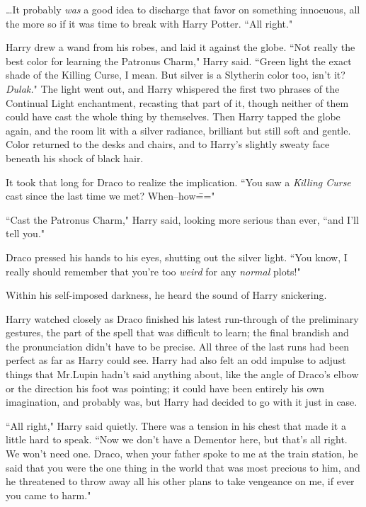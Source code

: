 {\ldots}It probably \emph{was} a good idea to discharge that favor on something innocuous, all the more so if it was time to break with Harry Potter. ``All right."

Harry drew a wand from his robes, and laid it against the globe. ``Not really the best color for learning the Patronus Charm," Harry said. ``Green light the exact shade of the Killing Curse, I mean. But silver is a Slytherin color too, isn't it? \emph{Dulak.}" The light went out, and Harry whispered the first two phrases of the Continual Light enchantment, recasting that part of it, though neither of them could have cast the whole thing by themselves. Then Harry tapped the globe again, and the room lit with a silver radiance, brilliant but still soft and gentle. Color returned to the desks and chairs, and to Harry's slightly sweaty face beneath his shock of black hair.

It took that long for Draco to realize the implication. ``You saw a \emph{Killing Curse} cast since the last time we met? When\---how\==="

``Cast the Patronus Charm," Harry said, looking more serious than ever, ``and I'll tell you."

Draco pressed his hands to his eyes, shutting out the silver light. ``You know, I really should remember that you're too \emph{weird} for any \emph{normal} plots!"

Within his self-imposed darkness, he heard the sound of Harry snickering.

\later

Harry watched closely as Draco finished his latest run-through of the preliminary gestures, the part of the spell that was difficult to learn; the final brandish and the pronunciation didn't have to be precise. All three of the last runs had been perfect as far as Harry could see. Harry had also felt an odd impulse to adjust things that Mr.\?Lupin hadn't said anything about, like the angle of Draco's elbow or the direction his foot was pointing; it could have been entirely his own imagination, and probably was, but Harry had decided to go with it just in case.

``All right," Harry said quietly. There was a tension in his chest that made it a little hard to speak. ``Now we don't have a Dementor here, but that's all right. We won't need one. Draco, when your father spoke to me at the train station, he said that you were the one thing in the world that was most precious to him, and he threatened to throw away all his other plans to take vengeance on me, if ever you came to harm."

